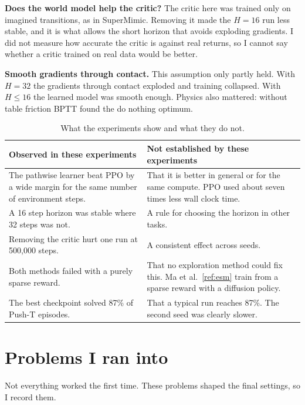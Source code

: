 \documentclass[11pt,a4paper]{article}
\newcommand{\thd}[1]{\textbf{\color{Ink}#1}}
\renewcommand{\cite}[1]{\ref{ref:#1}}
\begin{document}
\textbf{Does the world model help the critic?} The critic here was trained only on imagined
transitions, as in SuperMimic. Removing it made the $H=16$ run less stable, and it is what allows the
short horizon that avoids exploding gradients. I did not measure how accurate the critic is against
real returns, so I cannot say whether a critic trained on real data would be better.

\textbf{Smooth gradients through contact.} This assumption only partly held. With $H=32$ the
gradients through contact exploded and training collapsed. With $H \le 16$ the learned model was
smooth enough. Physics also mattered: without table friction BPTT found the do nothing optimum.

\begin{table}[htbp]
\centering
\small
\caption{What the experiments show and what they do not.}
\label{tab:claims}
\begin{tabularx}{\textwidth}{|L|L|}
\hline
{}
\thd{Observed in these experiments} & \thd{Not established by these experiments} \\
\hline
The pathwise learner beat PPO by a wide margin for the same number of environment steps. &
That it is better in general or for the same compute. PPO used about seven times less wall clock time. \\
\hline
A 16 step horizon was stable where 32 steps was not. &
A rule for choosing the horizon in other tasks. \\
\hline
Removing the critic hurt one run at 500{,}000 steps. &
A consistent effect across seeds. \\
\hline
Both methods failed with a purely sparse reward. &
That no exploration method could fix this. Ma et al.~\cite{esm} train from a sparse reward with a diffusion policy. \\
\hline
The best checkpoint solved 87\% of Push-T episodes. &
That a typical run reaches 87\%. The second seed was clearly slower. \\
\hline
\end{tabularx}
\end{table}

\section{Problems I ran into}
\label{sec:problems}

Not everything worked the first time. These problems shaped the final settings, so I record them.
\end{document}
